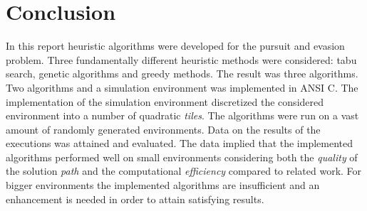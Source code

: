 \chapter{Conclusion}
In this report heuristic algorithms were developed for the pursuit and evasion problem. Three fundamentally different heuristic methods were considered: tabu search, genetic algorithms and greedy methods. The result was three algorithms. Two algorithms and a simulation environment was implemented in ANSI C. The implementation of the simulation environment discretized the considered environment into a number of quadratic \emph{tiles}. The algorithms were run on a vast amount of randomly generated environments. Data on the results of the executions was attained and evaluated. The data implied that the implemented algorithms performed well on small environments considering both the \emph{quality} of the solution \emph{path} and the computational \emph{efficiency} compared to related work. For bigger environments the implemented algorithms are insufficient and an enhancement is needed in order to attain satisfying results.